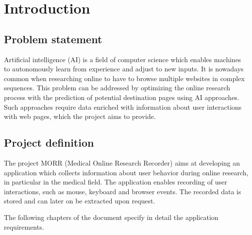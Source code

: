 \chapter{Introduction}
\label{ch:introduction}

\section{Problem statement}
Artificial intelligence (AI) is a field of computer science which enables machines to autonomously learn from experience and adjust to new inputs. It is nowadays common when researching online to have to browse multiple websites in complex sequences. This problem can be addressed by optimizing the online research process with the prediction of potential destination pages using AI approaches. Such approaches require data enriched with information about user interactions with web pages, which the project aims to provide.


\section{Project definition}
The project MORR (Medical Online Research Recorder) aims at developing an application which collects information about \gls{user} behavior during online research, in particular in the medical field. The application enables recording of \gls{user} interactions, such as mouse, keyboard and \gls{browser} \glspl{event}. The recorded data is stored and can later on be extracted upon request. 

The following chapters of the document specify in detail the application requirements.
